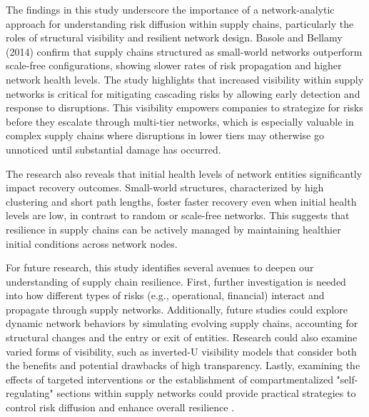 \documentclass{article}
\begin{document}
The findings in this study underscore the importance of a network-analytic approach for understanding risk diffusion within supply chains, particularly the roles of structural visibility and resilient network design. Basole and Bellamy (2014) confirm that supply chains structured as small-world networks outperform scale-free configurations, showing slower rates of risk propagation and higher network health levels. The study highlights that increased visibility within supply networks is critical for mitigating cascading risks by allowing early detection and response to disruptions. This visibility empowers companies to strategize for risks before they escalate through multi-tier networks, which is especially valuable in complex supply chains where disruptions in lower tiers may otherwise go unnoticed until substantial damage has occurred.

The research also reveals that initial health levels of network entities significantly impact recovery outcomes. Small-world structures, characterized by high clustering and short path lengths, foster faster recovery even when initial health levels are low, in contrast to random or scale-free networks. This suggests that resilience in supply chains can be actively managed by maintaining healthier initial conditions across network nodes.

For future research, this study identifies several avenues to deepen our understanding of supply chain resilience. First, further investigation is needed into how different types of risks (e.g., operational, financial) interact and propagate through supply networks. Additionally, future studies could explore dynamic network behaviors by simulating evolving supply chains, accounting for structural changes and the entry or exit of entities. Research could also examine varied forms of visibility, such as inverted-U visibility models that consider both the benefits and potential drawbacks of high transparency. Lastly, examining the effects of targeted interventions or the establishment of compartmentalized "self-regulating" sections within supply networks could provide practical strategies to control risk diffusion and enhance overall resilience \cite{Basole2014}.

\end{document}

